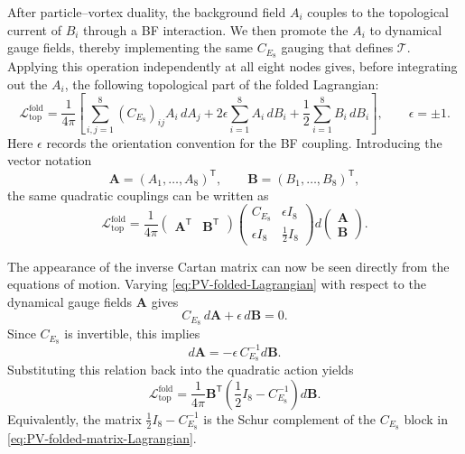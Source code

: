 \documentclass[11pt,a4paper]{article}
\numberwithin{equation}{section}
\begin{document}
After particle--vortex duality, the background field $A_i$ couples to the topological current of $B_i$ through a BF interaction.  We then promote the $A_i$ to dynamical gauge fields, thereby implementing the same $C_{E_8}$ gauging that defines $\mathcal T$.  Applying this operation independently at all eight nodes gives, before integrating out the $A_i$, the following topological part of the folded Lagrangian:
\begin{equation}
  \mathcal L_{\mathrm{top}}^{\mathrm{fold}}
  =\frac{1}{4\pi}
  \left[
  \sum_{i,j=1}^{8}(C_{E_8})_{ij}A_i\,dA_j
  +2\epsilon\sum_{i=1}^{8}A_i\,dB_i
  +\frac12\sum_{i=1}^{8}B_i\,dB_i
  \right],
  \qquad \epsilon=\pm1.
  \label{eq:PV-folded-Lagrangian}
\end{equation}
Here $\epsilon$ records the orientation convention for the BF coupling.  Introducing the vector notation
\begin{equation}
  \boldsymbol A=(A_1,\ldots,A_8)^{\mathsf T},
  \qquad
  \boldsymbol B=(B_1,\ldots,B_8)^{\mathsf T},
  \label{eq:AB-vector-notation}
\end{equation}
the same quadratic couplings can be written as
\begin{equation}
  \mathcal L_{\mathrm{top}}^{\mathrm{fold}}
  =
  \frac{1}{4\pi}
  \begin{pmatrix}
    \boldsymbol A^{\mathsf T} & \boldsymbol B^{\mathsf T}
  \end{pmatrix}
  \begin{pmatrix}
    C_{E_8} & \epsilon I_8\\
    \epsilon I_8 & \frac12 I_8
  \end{pmatrix}
  d
  \begin{pmatrix}
    \boldsymbol A\\
    \boldsymbol B
  \end{pmatrix}.
  \label{eq:PV-folded-matrix-Lagrangian}
\end{equation}

The appearance of the inverse Cartan matrix can now be seen directly from the equations of motion.  Varying \eqref{eq:PV-folded-Lagrangian} with respect to the dynamical gauge fields $\boldsymbol A$ gives
\begin{equation}
  C_{E_8}\,d\boldsymbol A
  +\epsilon\,d\boldsymbol B
  =0.
  \label{eq:A-equation-of-motion}
\end{equation}
Since $C_{E_8}$ is invertible, this implies
\begin{equation}
  d\boldsymbol A
  =-\epsilon\,C_{E_8}^{-1}d\boldsymbol B.
  \label{eq:A-solved-by-B}
\end{equation}
Substituting this relation back into the quadratic action yields
\begin{equation}
  \mathcal L_{\mathrm{top}}^{\mathrm{fold}}
  =\frac{1}{4\pi}
  \boldsymbol B^{\mathsf T}
  \left(
    \frac12 I_8-C_{E_8}^{-1}
  \right)
  d\boldsymbol B.
  \label{eq:PV-folded-effective-Lagrangian}
\end{equation}
Equivalently, the matrix $\frac12 I_8-C_{E_8}^{-1}$ is the Schur complement of the $C_{E_8}$ block in \eqref{eq:PV-folded-matrix-Lagrangian}.
\end{document}
